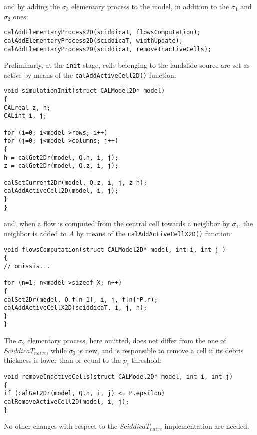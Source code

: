 \noindent and by adding the $\sigma_3$ elementary process to the
model, in addition to the $\sigma_1$ and $\sigma_2$ ones:

\begin{lstlisting}[basicstyle=\footnotesize, numbers=none]
calAddElementaryProcess2D(sciddicaT, flowsComputation);
calAddElementaryProcess2D(sciddicaT, widthUpdate);
calAddElementaryProcess2D(sciddicaT, removeInactiveCells);
\end{lstlisting}

Preliminarly, at the \texttt{init} stage, cells belonging to the landslide
source are set as active by means of the
\verb'calAddActiveCell2D()' function:
\begin{lstlisting}[basicstyle=\footnotesize, numbers=none]
void simulationInit(struct CALModel2D* model)
{        
CALreal z, h;
CALint i, j;

for (i=0; i<model->rows; i++)
for (j=0; j<model->columns; j++)
{
h = calGet2Dr(model, Q.h, i, j);
z = calGet2Dr(model, Q.z, i, j);

calSetCurrent2Dr(model, Q.z, i, j, z-h);
calAddActiveCell2D(model, i, j);
}
}
\end{lstlisting}

\noindent and, when a flow is computed from the central cell
towards a neighbor by $\sigma_1$, the neighbor is added to $A$ by
means of the \verb'calAddActiveCellX2D()' function:

\begin{lstlisting}[basicstyle=\footnotesize, numbers=none]
void flowsComputation(struct CALModel2D* model, int i, int j )
{
// omissis...

for (n=1; n<model->sizeof_X; n++)
{
calSet2Dr(model, Q.f[n-1], i, j, f[n]*P.r);
calAddActiveCellX2D(sciddicaT, i, j, n);
}
}
\end{lstlisting}

\noindent The $\sigma_2$ elementary process, here omitted, does
not differ from the one of $SciddicaT_{naive}$, while $\sigma_3$
is new, and is responsible to remove a cell if its debris
thickness is lower than or equal to the $p_\epsilon$ threshold:

\begin{lstlisting}[basicstyle=\footnotesize, numbers=none]
void removeInactiveCells(struct CALModel2D* model, int i, int j)
{
if (calGet2Dr(model, Q.h, i, j) <= P.epsilon)
calRemoveActiveCell2D(model, i, j);
}
\end{lstlisting}

\noindent No other changes with respect to the $SciddicaT_{naive}$
implementation are needed.

